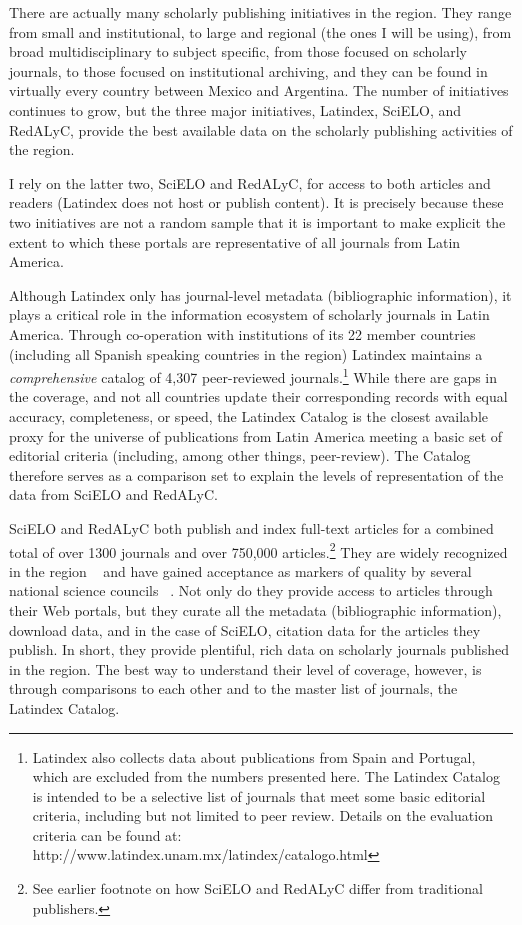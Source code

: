 There are actually many scholarly publishing initiatives in the region. They range from small and institutional, to large and regional (the ones I will be using), from broad multidisciplinary to subject specific, from those focused on scholarly journals, to those focused on institutional archiving, and they can be found in virtually every country between Mexico and Argentina. The number of initiatives continues to grow, but the three major initiatives, Latindex, SciELO, and RedALyC, provide the best available data on the scholarly publishing activities of the region.

I rely on the latter two, SciELO and RedALyC, for access to both articles and readers (Latindex does not host or publish content). It is precisely because these two initiatives are not a random sample that it is important to make explicit the extent to which these portals are representative of all journals from Latin America.

Although Latindex only has journal-level metadata (bibliographic information), it plays a critical role in the information ecosystem of scholarly journals in Latin America. Through co-operation with institutions of its 22 member countries (including all Spanish speaking countries in the region) Latindex maintains a \emph{comprehensive} catalog of 4,307 peer-reviewed journals.\footnote{Latindex also collects data about publications from Spain and Portugal, which are excluded from the numbers presented here. The Latindex Catalog is intended to be a selective list of journals that meet some basic editorial criteria, including but not limited to peer review. Details on the evaluation criteria can be found at: http:\slash \slash www.latindex.unam.mx\slash latindex\slash catalogo.html} While there are gaps in the coverage, and not all countries update their corresponding records with equal accuracy, completeness, or speed, the Latindex Catalog is the closest available proxy for the universe of publications from Latin America meeting a basic set of editorial criteria (including, among other things, peer-review). The Catalog therefore serves as a comparison set to explain the levels of representation of the data from SciELO and RedALyC.

SciELO and RedALyC both publish and index full-text articles for a combined total of over 1300 journals and over 750,000 articles.\footnote{See earlier footnote on how SciELO and RedALyC differ from traditional publishers.} They are widely recognized in the region ~\citep{Gomez2013} and have gained acceptance as markers of quality by several national science councils ~\citep{Alperin2011a}. Not only do they provide access to articles through their Web portals, but they curate all the metadata (bibliographic information), download data, and in the case of SciELO, citation data for the articles they publish. In short, they provide plentiful, rich data on scholarly journals published in the region. The best way to understand their level of coverage, however, is through comparisons to each other and to the master list of journals, the Latindex Catalog.

